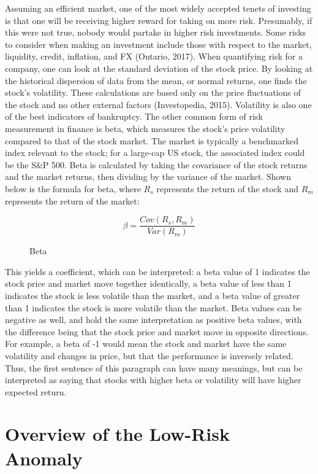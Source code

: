 \documentclass[12pt,twoside]{reedthesis}
\theoremstyle{definition}
\theoremstyle{definition}
\theoremstyle{definition}
\theoremstyle{remark}
\begin{document}
Assuming an efficient market, one of the most widely accepted tenets of
investing is that one will be receiving higher reward for taking on more
risk. Presumably, if this were not true, nobody would partake in higher
risk investments. Some risks to consider when making an investment
include those with respect to the market, liquidity, credit, inflation,
and FX (Ontario, 2017). When quantifying risk for a company, one can
look at the standard deviation of the stock price. By looking at the
historical dispersion of data from the mean, or normal returns, one
finds the stock's volatility. These calculations are based only on the
price fluctuations of the stock and no other external factors
(Investopedia, 2015). Volatility is also one of the best indicators of
bankruptcy. The other common form of risk measurement in finance is
beta, which measures the stock's price volatility compared to that of
the stock market. The market is typically a benchmarked index relevant
to the stock; for a large-cap US stock, the associated index could be
the S\&P 500. Beta is calculated by taking the covariance of the stock
returns and the market returns, then dividing by the variance of the
market. Shown below is the formula for beta, where \(R_s\) represents
the return of the stock and \(R_m\) represents the return of the market:
\begin{figure}
$$ \beta = \frac{Cov(R_s, R_m)} {Var(R_m)}$$
\caption{Beta}
\end{figure}
This yields a coefficient, which can be interpreted: a beta value of 1
indicates the stock price and market move together identically, a beta
value of less than 1 indicates the stock is less volatile than the
market, and a beta value of greater than 1 indicates the stock is more
volatile than the market. Beta values can be negative as well, and hold
the same interpretation as positive beta values, with the difference
being that the stock price and market move in opposite directions. For
example, a beta of -1 would mean the stock and market have the same
volatility and changes in price, but that the performance is inversely
related. Thus, the first sentence of this paragraph can have many
meanings, but can be interpreted as saying that stocks with higher beta
or volatility will have higher expected return.

\section{Overview of the Low-Risk
Anomaly}\label{overview-of-the-low-risk-anomaly}
\end{document}
